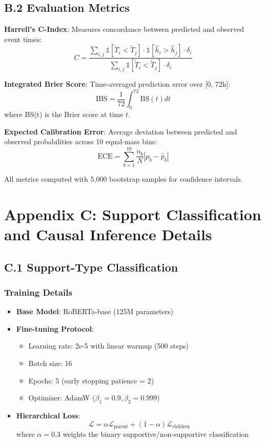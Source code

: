 \documentclass[letterpaper]{article} %
\begin{document}
\subsection{B.2 Evaluation Metrics}

\textbf{Harrell's C-Index}: Measures concordance between predicted and observed event times:
$$C = \frac{\sum_{i,j} \mathbb{1}[\tilde{T}_i < \tilde{T}_j] \cdot \mathbb{1}[\hat{h}_i > \hat{h}_j] \cdot \delta_i}{\sum_{i,j} \mathbb{1}[\tilde{T}_i < \tilde{T}_j] \cdot \delta_i}$$

\textbf{Integrated Brier Score}: Time-averaged prediction error over [0, 72h]:
$$\text{IBS} = \frac{1}{72} \int_0^{72} \text{BS}(t) dt$$
where BS(t) is the Brier score at time $t$.

\textbf{Expected Calibration Error}: Average deviation between predicted and observed probabilities across 10 equal-mass bins:
$$\text{ECE} = \sum_{b=1}^{10} \frac{n_b}{N} |p_b - \hat{p}_b|$$

All metrics computed with 5,000 bootstrap samples for confidence intervals.
\section{Appendix C: Support Classification and Causal Inference Details}

\subsection{C.1 Support-Type Classification}

\subsubsection{Training Details}
\begin{itemize}
\item \textbf{Base Model}: RoBERTa-base (125M parameters)
\item \textbf{Fine-tuning Protocol}:
  \begin{itemize}
  \item Learning rate: 2e-5 with linear warmup (500 steps)
  \item Batch size: 16
  \item Epochs: 5 (early stopping patience = 2)
  \item Optimizer: AdamW ($\beta_1=0.9, \beta_2=0.999$)
  \end{itemize}
\item \textbf{Hierarchical Loss}: 
  $$\mathcal{L} = \alpha \mathcal{L}_{\text{parent}} + (1-\alpha) \mathcal{L}_{\text{children}}$$
  where $\alpha = 0.3$ weights the binary supportive/non-supportive classification
\end{itemize}
\end{document}
